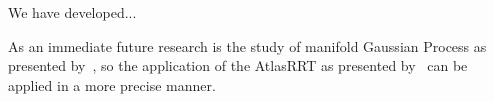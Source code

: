 We have developed...

As an immediate future research is the study of manifold Gaussian Process as presented by~\citet{Calandra2014Manifold}, so the application of the AtlasRRT as presented by~\citet{Jaillet2013Path} can be applied in a more precise manner.